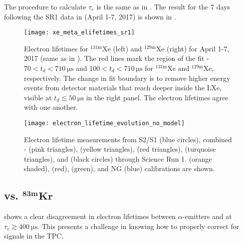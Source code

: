 The procedure to calculate $\tau_e$ is the same as in .  The result for the
7 days following the SR1 \ambe data in  (April 1-7, 2017)
is shown in .

\begin{figure}
\centering
\texttt{[image: xe\_meta\_elifetimes\_sr1]}
\caption{Electron lifetimes for $\mathrm{^{131m}Xe}$ (left) and $\mathrm{^{129m}Xe}$ (right) for April 1-7, 2017 (same as in
).  The red lines mark the region of the fit - $70 < t_d < 710\ \mathrm{\mu s}$
and $100 < t_d < 710\ \mathrm{\mu s}$ for $\mathrm{^{131m}Xe}$ and $\mathrm{^{129m}Xe}$, respectively.  The change in fit boundary is to
remove higher energy events from detector materials that reach deeper inside the LXe, visible at $t_d \lesssim 50\ \mathrm{\mu s}$ in the
right panel.  The electron lifetimes agree with one another.}
\label{fig:electron_lifetimes_measurement_gammas_elifetime}
\end{figure}

\begin{figure}
\centering
\texttt{[image: electron\_lifetime\_evolution\_no\_model]}
\caption{Electron lifetime measurements from S2/S1 (blue circles), combined - (pink triangles), 
(yellow triangles),  (red triangles),  (turquoise triangles), and
\metakr (black circles) through Science Run 1.  \metakr (orange shaded),  (red), \ambe (green), and NG (blue) calibrations
are shown.}
\label{fig:electron_lifetimes_evolution_no_model}
\end{figure}



\subsection{ vs. $\mathbf{^{83m}Kr}$}
\label{subsec:electron_lifetimes_rn222_vs_kr83m}
 shows a clear disagreement in electron lifetimes between $\alpha$-emitters and \metakr
at $\tau_e \gtrsim 400\ \mathrm{\mu s}$.  This presents a challenge in knowing how to properly correct \stwob for signals in the TPC.

